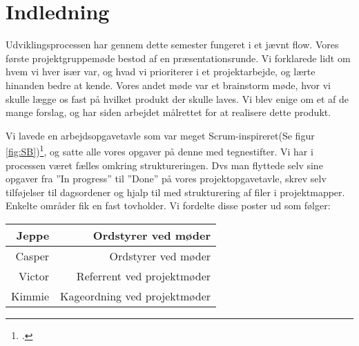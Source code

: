\chapter{Indledning}

Udviklingsprocessen har gennem dette semester fungeret i et jævnt flow. Vores første projektgruppemøde bestod af en præsentationsrunde. Vi forklarede lidt om hvem vi hver især var, og hvad vi prioriterer i et projektarbejde, og lærte hinanden bedre at kende. Vores andet møde var et brainstorm møde, hvor vi skulle lægge os fast på hvilket produkt der skulle laves. Vi blev enige om et af de mange forslag, og har siden arbejdet målrettet for at realisere dette produkt.

Vi lavede en arbejdsopgavetavle som var meget Scrum-inspireret(Se figur \ref{fig:SB})\footcite{scrum}, og satte alle vores opgaver på denne med tegnestifter. 
Vi har i processen været fælles omkring struktureringen. Dvs man flyttede selv sine opgaver fra ”In progress” til ”Done” på vores projektopgavetavle, skrev selv tilføjelser til dagsordener og hjalp til med strukturering af filer i projektmapper. 
Enkelte områder fik en fast tovholder. Vi fordelte disse poster ud som følger:

\begin{table}[H] \centering
\begin{tabular}{|r|r|}
	\hline
		Jeppe & Ordstyrer ved møder \\ \hline
		Casper & Ordstyrer ved møder \\ \hline
		Victor & Referrent ved projektmøder \\ \hline
		Kimmie & Kageordning ved projektmøder \\ \hline
	\end{tabular}
\end{table}